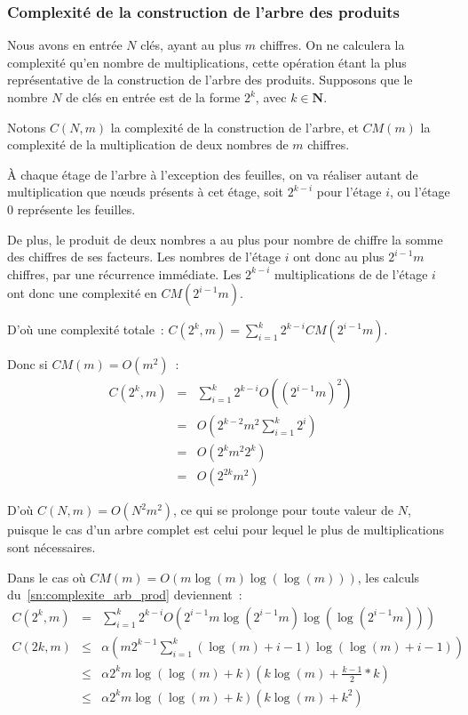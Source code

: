 \documentclass[a4paper,10pt]{article}
\begin{document}
  \subsubsection{Complexité de la construction de l'arbre des produits\label{sn:complexite_arb_prod}}
  Nous avons en entrée $N$ clés, ayant au plus $m$ chiffres.
  On ne calculera la complexité qu'en nombre de multiplications, cette opération étant la plus représentative de la construction de l'arbre des produits.
  Supposons que le nombre $N$ de clés en entrée est de la forme $2^k$, avec $k\in\mathbf{N}$.
  
  Notons $C(N,m)$ la complexité de la construction de l'arbre, et $CM(m)$ la complexité de la multiplication de deux nombres de $m$ chiffres.
  
  À chaque étage de l'arbre à l'exception des feuilles, on va réaliser autant de multiplication que nœuds présents à cet étage, soit $2^{k-i}$ pour l'étage $i$, ou l'étage $0$ représente les feuilles.
  
  De plus, le produit de deux nombres a au plus pour nombre de chiffre la somme des chiffres de ses facteurs.
  Les nombres de l'étage $i$ ont donc au plus $2^{i-1}m$ chiffres, par une récurrence immédiate.
  Les $2^{k-i}$ multiplications de de l'étage $i$ ont donc une complexité en $CM(2^{i-1}m)$.
  
  D'où une complexité totale~: $C(2^k,m) = \sum_{i=1}^k 2^{k-i}CM(2^{i-1}m)$.
  
  Donc si $CM(m) = O(m^2)$~:
  \begin{eqnarray*}
   C(2^k,m) &=& \sum_{i=1}^k 2^{k-i}O({(2^{i-1}m)}^2)\\
   &=& O(2^{k-2}m^2\sum_{i=1}^k 2^i)\\
   &=& O(2^k m^2 2^k)\\
   &=& O(2^{2k} m^2)
  \end{eqnarray*}
  
  D'où $C(N,m) = O(N^2m^2)$, ce qui se prolonge pour toute valeur de $N$, puisque le cas d'un arbre complet est celui pour lequel le plus de multiplications sont nécessaires.
  
  Dans le cas où $CM(m) = O(m\log(m)\log(\log(m)))$, les calculs du~\ref{sn:complexite_arb_prod} deviennent~:
  \begin{eqnarray*}
   C(2^k,m) &=& \sum_{i=1}^k 2^{k-i}O(2^{i-1}m\log(2^{i-1}m)\log(\log(2^{i-1}m)))\\
   C(2k,m) &\leq& \alpha(m2^{k-1}\sum_{i=1}^k(\log(m)+i-1)\log(\log(m)+i-1))\\
   &\leq& \alpha 2^k m \log(\log(m)+k)(k \log(m) + \frac{k-1}{2}*k)\\
   &\leq& \alpha 2^k m \log(\log(m)+k)(k\log(m)+k^2)
  \end{eqnarray*}
  
\end{document}
